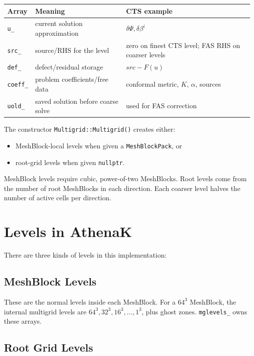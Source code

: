 \documentclass[11pt]{article}
\newcommand{\code}[1]{\texttt{#1}}
\begin{document}
\begin{center}
\begin{tabular}{lll}
\toprule
\textbf{Array} & \textbf{Meaning} & \textbf{CTS example} \\
\midrule
\code{u\_} & current solution approximation & \(\delta\Psi,\delta\beta^i\) \\
\code{src\_} & source/RHS for the level & zero on finest CTS level; FAS RHS on coarser levels \\
\code{def\_} & defect/residual storage & \(src-F(u)\) \\
\code{coeff\_} & problem coefficients/free data & conformal metric, \(K\), \(\alpha\), sources \\
\code{uold\_} & saved solution before coarse solve & used for FAS correction \\
\bottomrule
\end{tabular}
\end{center}

The constructor \code{Multigrid::Multigrid()} creates either:
\begin{itemize}
  \item MeshBlock-local levels when given a \code{MeshBlockPack}, or
  \item root-grid levels when given \code{nullptr}.
\end{itemize}

MeshBlock levels require cubic, power-of-two MeshBlocks.  Root levels come from
the number of root MeshBlocks in each direction.  Each coarser level halves the
number of active cells per direction.

\section{Levels in AthenaK}

There are three kinds of levels in this implementation:

\subsection{MeshBlock Levels}

These are the normal levels inside each MeshBlock.  For a \(64^3\) MeshBlock,
the internal multigrid levels are \(64^3,32^3,16^3,\ldots,1^3\), plus ghost
zones.  \code{mglevels\_} owns these arrays.

\subsection{Root Grid Levels}
\end{document}
